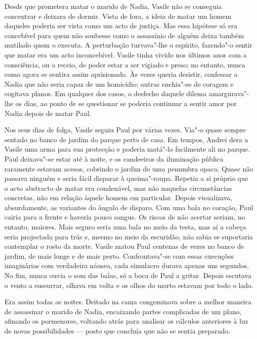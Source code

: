 Desde que prometera matar o marido de Nadia, Vasile não se conseguia
concentrar e deixara de dormir. Vista de fora, a ideia de matar um homem
daqueles poderia ser vista como um acto de justiça. Mas essa hipótese só
era concebível para quem não soubesse como o assassínio de alguém deixa
também mutilado quem o executa. A perturbação turvava"-lhe o espírito,
fazendo"-o sentir que matar era um acto inconcebível. Vasile tinha vivido
nos últimos anos com a consciência, ou o receio, de poder estar a ser
vigiado e preso; no entanto, nunca como agora se sentira assim
aprisionado. Às vezes queria desistir, confessar a Nadia que não seria
capaz de um homicídio; outras enchia"-se de coragem e cogitava planos. Em qualquer dos casos, o desfecho
daquele dilema amargurava"-lhe os dias, ao ponto
de se questionar se poderia continuar a sentir amor por Nadia depois de
matar Paul.

Nos seus dias de folga, Vasile seguiu Paul por várias vezes. Via"-o quase
sempre sentado no banco de jardim do parque perto de casa. Em tempos,
Andrei dera a Vasile uma arma para sua protecção e poderia matá"-lo
facilmente ali no parque. Paul deixava"-se estar até à noite, e os
candeeiros da iluminação pública raramente estavam acesos, cobrindo o
jardim de uma penumbra opaca. Quase não passava ninguém e seria fácil
disparar à queima"-roupa. Repetia a si próprio que o acto abstracto de
matar era condenável, mas não naquelas circunstâncias concretas, não em
relação àquele homem em particular. Depois visualizava, absurdamente,
as variantes do ângulo de disparo. Com uma bala no coração, Paul cairia
para a frente e haveria pouco sangue. Os riscos de não acertar seriam,
no entanto, maiores. Mais seguro seria uma bala no meio da testa, mas aí
a cabeça seria projectada para trás e, mesmo no meio da escuridão, não
sabia se suportaria contemplar o rosto da morte. Vasile matou Paul
centenas de vezes no banco de jardim, de mais longe e de mais perto.
Confrontava"-se com essas execuções imaginárias com verdadeira náusea, cada simulacro durava apenas uns segundos. No fim, nunca ouvia o
som das balas, só a boca de Paul a gritar. Depois escutava o vento a
sussurrar, olhava em volta e os olhos do morto estavam por todo o lado.

Era assim todas as noites. Deitado na cama congeminava sobre a melhor
maneira de assassinar o marido de Nadia, encaixando partes complicadas
de um plano, afinando os pormenores, voltando atrás para analisar os
cálculos anteriores à luz de novas possibilidades --- posto que concluía
que não se sentia preparado.

